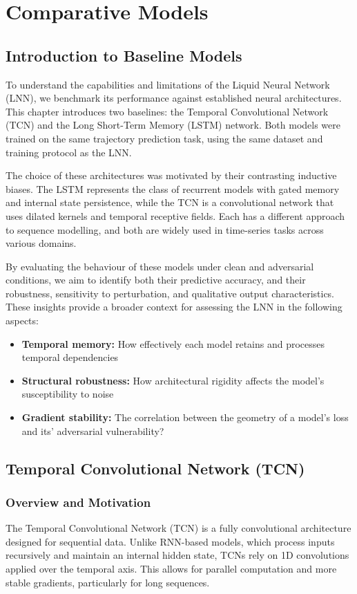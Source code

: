\chapter{Comparative Models}

\section{Introduction to Baseline Models}

To understand the capabilities and limitations of the Liquid Neural Network (LNN), we benchmark its performance against established neural architectures. This chapter introduces two baselines: the Temporal Convolutional Network (TCN) and the Long Short-Term Memory (LSTM) network. Both models were trained on the same trajectory prediction task, using the same dataset and training protocol as the LNN.

The choice of these architectures was motivated by their contrasting inductive biases. The LSTM represents the class of recurrent models with gated memory and internal state persistence, while the TCN is a convolutional network that uses dilated kernels and temporal receptive fields. Each has a different approach to sequence modelling, and both are widely used in time-series tasks across various domains.

By evaluating the behaviour of these models under clean and adversarial conditions, we aim to identify both their predictive accuracy, and their robustness, sensitivity to perturbation, and qualitative output characteristics. These insights provide a broader context for assessing the LNN in the following aspects:
\begin{itemize}
    \item \textbf{Temporal memory:} How effectively each model retains and processes temporal dependencies
    \item \textbf{Structural robustness:} How architectural rigidity affects the model's susceptibility to noise
    \item \textbf{Gradient stability:} The correlation between  the geometry of a model's loss and its' adversarial vulnerability?
\end{itemize}

\section{Temporal Convolutional Network (TCN)}

\subsection{Overview and Motivation}
The Temporal Convolutional Network (TCN) is a fully convolutional architecture designed for sequential data. Unlike RNN-based models, which process inputs recursively and maintain an internal hidden state, TCNs rely on 1D convolutions applied over the temporal axis. This allows for parallel computation and more stable gradients, particularly for long sequences.

